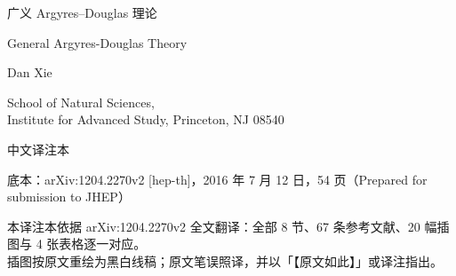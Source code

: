 \documentclass[UTF8,a4paper,11pt]{ctexart}
\begin{document}
\begin{titlepage}
\centering
\vspace*{2.6cm}
{\heiti{} 广义 Argyres--Douglas 理论\par}
\vspace{1.0cm}
{\kaishu{} General Argyres-Douglas Theory\par}
\vspace{2.0cm}
{ Dan Xie\par}
\vspace{0.5cm}
{ School of Natural Sciences,\\ Institute for Advanced Study, Princeton, NJ 08540\par}
\vspace{1.6cm}
{\kaishu{} 中文译注本\par}
\vspace{0.8cm}
{ 底本：arXiv:1204.2270v2 [hep-th]，2016 年 7 月 12 日，54 页（Prepared for submission to JHEP）\par}
\vfill
{\kaishu{}
\parbox{0.82\linewidth}{\centering
本译注本依据 arXiv:1204.2270v2 全文翻译：全部 8 节、67 条参考文献、20 幅插图与 4 张表格逐一对应。\\
插图按原文重绘为黑白线稿；原文笔误照译，并以「【原文如此】」或译注指出。}\par}
\vspace{1.0cm}
\end{titlepage}

{\footnotesize
\tableofcontents}
\newpage






















\end{document}
